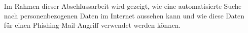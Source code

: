\label{cha:kurzfassung} 
Im Rahmen dieser Abschlussarbeit wird gezeigt, wie eine automatisierte Suche nach personenbezogenen Daten im Internet aussehen kann und wie diese Daten für einen Phishing-Mail-Angriff verwendet werden können. 





